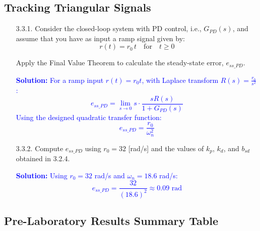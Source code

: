 \documentclass{article}
\begin{document}
\subsection{Tracking Triangular Signals}
\begin{itemize}
    \item[3.3.1.] Consider the closed-loop system with PD control, i.e., $G_{PD}(s)$, and assume that you have as input a ramp signal given by:
    \begin{equation}
        r(t) = r_0 \, t \quad \text{for} \quad t \geq 0
    \end{equation}
    
    Apply the Final Value Theorem to calculate the steady-state error, $e_{ss\_ PD}$.

    \textcolor{blue}{\textbf{Solution:} For a ramp input $r(t) = r_0 t$, with Laplace transform $R(s) = \frac{r_0}{s^2}$:
    \[
    e_{ss\_ PD} = \lim_{s \to 0} s \cdot \frac{s R(s)}{1 + G_{PD}(s)}
    \]
    Using the designed quadratic transfer function:
    \[
    e_{ss\_ PD} = \frac{r_0}{\omega_n^2}
    \]}

    \item[3.3.2.] Compute $e_{ss\_ PD}$ using $r_0 = 32$ [rad/s] and the values of $k_p$, $k_d$, and $b_{sd}$ obtained in 3.2.4.
    
    \textcolor{blue}{\textbf{Solution:} Using $r_0 = 32$ rad/s and $\omega_n = 18.6$ rad/s:
    \[
    e_{ss\_ PD} = \frac{32}{(18.6)^2} \approx 0.09 \text{ rad}
    \]}
\end{itemize}

\subsection{Pre-Laboratory Results Summary Table}
\end{document}
